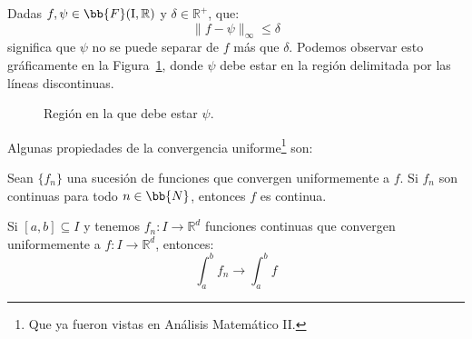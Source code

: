 \begin{ejemplo}
    Dadas $f,\psi \in \bb{F}(\text{I},\mathbb{R})$ y $\delta\in \mathbb{R}^+$, que:
    \begin{equation*}
        \|f-\psi\|_\infty \leq \delta
    \end{equation*}
    significa que $\psi$ no se puede separar de $f$ más que $\delta$. Podemos observar esto gráficamente en la Figura~\ref{fig:conv_unif}, donde $\psi$ debe estar en la región delimitada por las líneas discontinuas.
    \begin{figure}[H]
        \centering
        \caption{Región en la que debe estar $\psi$.}
        \label{fig:conv_unif}
    \end{figure}

\end{ejemplo}

\noindent
Algunas propiedades de la convergencia uniforme\footnote{Que ya fueron vistas en Análisis Matemático II.} son:
\begin{prop}
    Sean $\{f_n\}$ una sucesión de funciones que convergen uniformemente a $f$.
    Si $f_n$ son continuas para todo $n\in \bb{N}$, entonces $f$ es continua.
\end{prop}

\begin{prop}
    Si $[a,b]\subseteq I$ y tenemos $f_n:I\rightarrow\mathbb{R}^d$ funciones continuas que convergen uniformemente a $f:I\rightarrow\mathbb{R}^d$, entonces:
    \begin{equation*}
        \int_{a}^{b} f_n \rightarrow \int_a^b f
    \end{equation*}
\end{prop}

